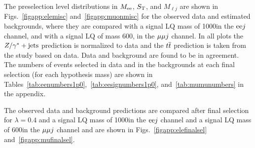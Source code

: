 The preselection level distributions in $M_{\mathrm{e} \mathrm{e}}$, $S_{\mathrm{T}}$, and $M_{\ell j}$ are shown in Figs.~\ref{figapp:elemisc} and~\ref{figapp:muonmisc} for the observed data and estimated backgrounds, where they are compared with a signal LQ mass of 1000\GeV in the $\mathrm{e} \mathrm{e} j$ channel, and with a signal LQ of mass 600\GeV, in the ${\mu} {\mu} j$ channel.  In all plots the $\relax{Z}/\gamma^* + {\rm jets}$ prediction is normalized to data and the $\relax{t}\overline{\relax{t}}$ prediction is taken from the study based on data.  Data and background are found to be in agreement.  The numbers of events selected in data and in the backgrounds at each final selection (for each hypothesis mass) are shown in Tables~\ref{tab:eenumbers1p0},~\ref{tab:eesignumbers1p0}, and~\ref{tab:mumunumbers} in the appendix.

The observed data and background predictions are compared after final selection for $\lambda = 0.4$ and a signal LQ mass of 1000\GeV in the $\mathrm{e} \mathrm{e} j$ channel and a signal LQ mass of 600\GeV in the ${\mu} {\mu} j$ channel and are shown in Figs.~\ref{figapp:elefinalsel} and~\ref{figapp:mufinalsel}.

